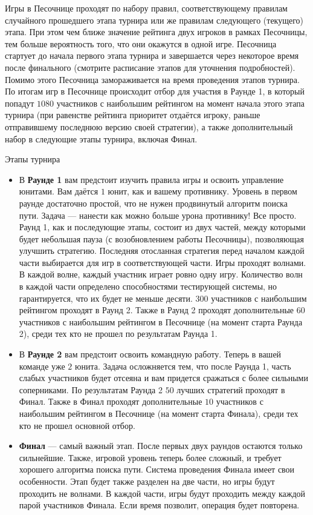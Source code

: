 Игры в Песочнице проходят по набору правил, соответствующему правилам случайного прошедшего этапа турнира или же правилам следующего (текущего) этапа.
При этом чем ближе значение рейтинга двух игроков в рамках Песочницы, тем больше вероятность того, что они окажутся в одной игре.
Песочница стартует до начала первого этапа турнира и завершается через некоторое время после финального
(смотрите расписание этапов для уточнения подробностей).
Помимо этого Песочница замораживается на время проведения этапов турнира.
По итогам игр в Песочнице происходит отбор для участия в Раунде 1, в который попадут $1080$ участников с наибольшим рейтингом на момент начала этого этапа турнира
(при равенстве рейтинга приоритет отдаётся игроку, раньше отправившему последнюю версию своей стратегии),
а также дополнительный набор в следующие этапы турнира, включая Финал.

Этапы турнира
\begin{itemize}
      \item
            В \textbf{Раунде 1} вам предстоит изучить правила игры и освоить управление юнитами.
            Вам даётся $1$ юнит, как и вашему противнику. Уровень в первом раунде достаточно простой, что не нужен продвинутый алгоритм поиска пути.
            Задача --- нанести как можно больше урона противнику! Все просто.
            Раунд 1, как и последующие этапы, состоит из двух частей, между которыми будет небольшая пауза (с возобновлением работы Песочницы), позволяющая улучшить стратегию.
            Последняя отосланная стратегия перед началом каждой части выбирается для игр в соответствующей части.
            Игры проходят волнами. В каждой волне, каждый участник играет ровно одну игру.
            Количество волн в каждой части определено способностями тестирующей системы, но гарантируется, что их будет не меньше десяти.
            $300$ участников с наибольшим рейтингом проходят в Раунд 2. Также в Раунд 2 проходят дополнительные $60$ участников с наибольшим рейтингом в Песочнице
            (на момент старта Раунда 2), среди тех кто не прошел по результатам Раунда 1.
      \item
            В \textbf{Раунде 2} вам предстоит освоить командную работу.
            Теперь в вашей команде уже $2$ юнита.
            Задача осложняется тем, что после Раунда 1, часть слабых участников будет отсеяна и вам придется сражаться с более сильными соперниками.
            По результатам Раунда 2 $50$ лучших стратегий проходят в Финал. Также в Финал проходят дополнительные $10$ участников с наибольшим рейтингом в Песочнице
            (на момент старта Финала), среди тех кто не прошел основной отбор.
      \item
            \textbf{Финал} --- самый важный этап. После первых двух раундов остаются только сильнейшие.
            Также, игровой уровень теперь более сложный, и требует хорошего алгоритма поиска пути.
            Система проведения Финала имеет свои особенности.
            Этап будет также разделен на две части, но игры будут проходить не волнами. В каждой части, игры будут проходить между каждой парой участников Финала.
            Если время позволит, операция будет повторена.
\end{itemize}

